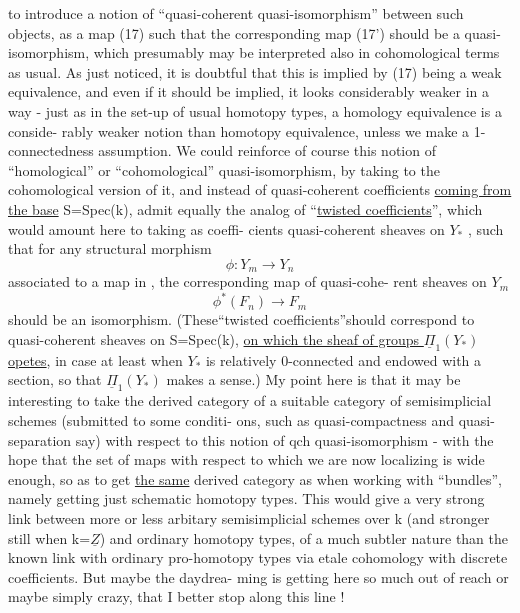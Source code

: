 
to introduce a notion of ``quasi-coherent  quasi-isomorphism'' between
such objects, as a map (17) such that the corresponding map (17')
should be a quasi-isomorphism, which presumably may be interpreted also
in cohomological terms\hand{,} as usual. As just noticed, it is doubtful that
this is implied by (17) being a weak equivalence, and even if it should
be implied, it looks considerably weaker in a way - just as in the
set-up of usual homotopy types,  a homology equivalence is a conside-%
rably weaker notion than homotopy equivalence, unless  we make 
a 1-connectedness assumption. We could reinforce of course this notion
of  ``homological'' or ``cohomological'' quasi-isomorphism, by taking to the
cohomological version of it, and instead of quasi-coherent 
coefficients \uline{coming from the base} S=Spec(k), admit equally the analog
of ``\uline{twisted coefficients}'', which would amount here to taking as coeffi-%
cients quasi-coherent sheaves  on $Y_*$ , such that for any structural
morphism
\[ \phi : Y_m \to Y_n \]
associated to a map in \hand{$\Delta$} , the corresponding map of  quasi-cohe-%
rent sheaves on $Y_m$
\[ \phi^*(F_n) \to F_m \]
should be an isomorphism. (These``twisted coefficients''should correspond
to quasi-coherent sheaves on S=Spec(k), \uline{on which the sheaf of groups
$\underline{\Pi}_1(Y_*)$ opetes}, in case at least when $Y_*$ is relatively 0-connected
and endowed with a section, so that $\underline{\Pi}_1(Y_*)$ makes a sense.) My point
here is that it may be interesting to take the derived category of a
suitable category of semisimplicial schemes (submitted to some  conditi-%
ons, such as quasi-compactness and quasi-separation say) with respect
 to this notion of qch quasi-isomorphism - with the hope that the set of
maps with respect to which we are now localizing is wide enough, so as
to get \uline{the same} derived category as when working  with ``bundles'', namely
getting just schematic homotopy types. This would give a very strong
link between more or less arbitary semisimplicial schemes over k (and
stronger still when k=$\underline{Z}$)\hand{,} and ordinary homotopy types, of a much subtler
nature than the known link with ordinary pro-homotopy types via etale
cohomology with discrete coefficients. But maybe  the daydrea-%
ming is getting here so much out of reach or maybe simply crazy, that
I better stop along this line !

